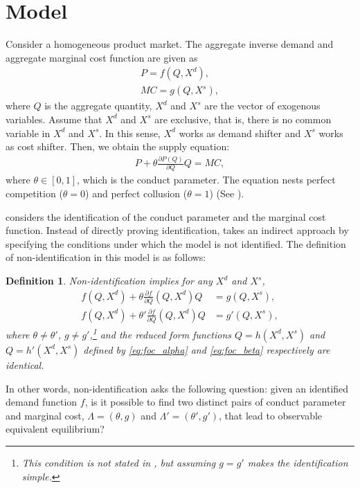 \documentclass[11pt, a4paper]{article}
\newtheorem{definition}{Definition}
\theoremstyle{remark}
\begin{document}
\section{Model}
Consider a homogeneous product market.
The aggregate inverse demand and aggregate marginal cost function are given as
\begin{align}
    P = f(Q, X^{d}), \label{eq:demand}
    \\
    MC = g(Q, X^{s}),\label{eq:marginal_cost}
\end{align}
where $Q$ is the aggregate quantity, $X^{d}$ and $X^{s}$ are the vector of exogenous variables.
Assume that $X^{d}$ and $X^{s}$ are exclusive, that is, there is no common variable in $X^{d}$ and $X^{s}$.
In this sense, $X^{d}$ works as demand shifter and $X^{s}$ works as cost shifter. 
Then, we obtain the supply equation:
\begin{align}
     P + \theta\frac{\partial P(Q)}{\partial Q}Q = MC,\label{eq:supply_equation}
\end{align}
where $\theta\in[0,1]$, which is the conduct parameter. 
The equation nests perfect competition ($\theta=0$) and perfect collusion ($\theta=1$) (See \cite{bresnahan1982oligopoly}). 

\citet{lau1982identifying} considers the identification of the conduct parameter and the marginal cost function. 
Instead of directly proving identification, \citet{lau1982identifying} takes an indirect approach by specifying the conditions under which the model is not identified. 
The definition of non-identification in this model is as follows:
\begin{definition}\label{def:non_identification}
    Non-identification implies for any $X^{d}$ and $X^{s}$,
    \begin{align}
    f(Q, X^{d}) + \theta \frac{\partial f}{\partial Q}(Q, X^{d})Q &= g(Q, X^{s}),  \label{eq:foc_alpha}\\
    f(Q, X^{d}) + \theta' \frac{\partial f}{\partial Q}(Q, X^{d})Q &= g'(Q, X^{s}),\label{eq:foc_beta}
    \end{align}
    where $\theta \neq \theta'$, $g \ne g'$,\footnote{This condition is not stated in \citet{lau1982identifying}, but assuming $g = g'$ makes the identification simple.} and the reduced form functions $Q = h(X^{d}, X^{s})$ and $Q = h'(X^{d}, X^{s})$ defined by \eqref{eq:foc_alpha} and \eqref{eq:foc_beta} respectively are identical.
\end{definition}
In other words, non-identification asks the following question: given an identified demand function $f$, is it possible to find two distinct pairs of conduct parameter and marginal cost, $\Lambda = (\theta, g)$ and $\Lambda' = (\theta', g')$, that lead to observable equivalent equilibrium?
\end{document}
